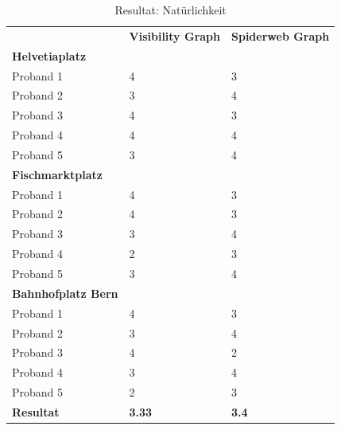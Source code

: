 \begin{table}[H]
    \centering
    \caption{Resultat: Natürlichkeit}
    \label{table:Resultat Natürlichkeit}
    \begin{tabular}{lll}
        & \textbf{Visibility Graph} & \textbf{Spiderweb Graph} \\
        \textbf{Helvetiaplatz}   &                          &                          \\
        Proband 1                & 4                        & 3                        \\
        Proband 2                & 3                        & 4                        \\
        Proband 3                & 4                        & 3                        \\
        Proband 4                & 4                        & 4                        \\
        Proband 5                & 3                        & 4                        \\
        \textbf{Fischmarktplatz} &                          &                          \\
        Proband 1                & 4                        & 3                        \\
        Proband 2                & 4                        & 3                        \\
        Proband 3                & 3                        & 4                        \\
        Proband 4                & 2                        & 3                        \\
        Proband 5                & 3                        & 4                        \\
        \textbf{Bahnhofplatz Bern} &                        &                          \\
        Proband 1                & 4                        & 3                        \\
        Proband 2                & 3                        & 4                        \\
        Proband 3                & 4                        & 2                        \\
        Proband 4                & 3                        & 4                        \\
        Proband 5                & 2                        & 3                        \\
        \textbf{Resultat}        & \textbf{3.33}               & \textbf{3.4}                       
    \end{tabular}
\end{table}

